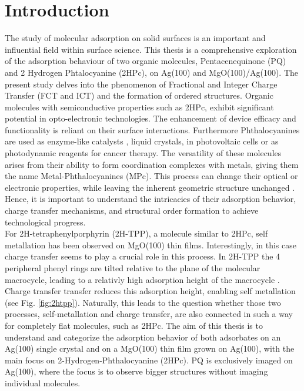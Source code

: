 \chapter{Introduction}
\label{sec:anmerkung}
The study of molecular adsorption on solid surfaces is an important and influential field within surface science.
This thesis is a comprehensive exploration of the adsorption behaviour of two organic molecules, Pentacenequinone (PQ) and 2 Hydrogen Phtalocyanine (2HPc), on Ag(100) and MgO(100)/Ag(100).
The present study delves into the phenomenon of Fractional and Integer Charge Transfer (FCT and ICT) and the formation of ordered structures. 
Organic molecules with semiconductive properties such as 2HPc, exhibit significant potential in opto-electronic technologies.
The enhancement of device efficacy and functionality is reliant on their surface interactions. 
Furthermore Phthalocyanines are used as enzyme-like catalysts , liquid crystals, in photovoltaic cells or as photodynamic reagents for cancer therapy. \cite{wang2012structures}
The versatility of these molecules arises from their ability to form coordination complexes with metals, giving them the name Metal-Phthalocyanines (MPc).\cite{wang2012structures}
This process can change their optical or electronic properties, while leaving the inherent geometric structure unchanged \cite{wang2012structures}.
Hence, it is important to understand the intricacies of their adsorption behavior, charge transfer mechanisms, and structural order formation to achieve technological progress. \\
For 2H-tetraphenylporphyrin (2H-TPP), a molecule similar to 2HPc, self metallation has been observed on MgO(100) thin films. \cite{egger2021charge}
Interestingly, in this case charge transfer seems to play a crucial role in this process.
In 2H-TPP the 4 peripheral phenyl rings are tilted relative to the plane of the molecular macrocycle, leading to a relativly high adsorption height of the macrocycle .
Charge transfer transfer reduces this adsorption height, enabling self metallation (see Fig. \ref{fig:2htpp}).
Naturally, this leads to the question whether those two processes, self-metallation and charge transfer, are also connected in such a way for completely flat molecules, such as 2HPc.
The aim of this thesis is to understand and categorize the adsorption behavior of both
adsorbates on an Ag(100) single crystal and on a MgO(100) thin film grown on
Ag(100), with the main focus on 2-Hydrogen-Phthalocyanine (2HPc).
PQ is exclusively imaged on Ag(100), where the focus is to observe bigger structures without imaging individual molecules.



